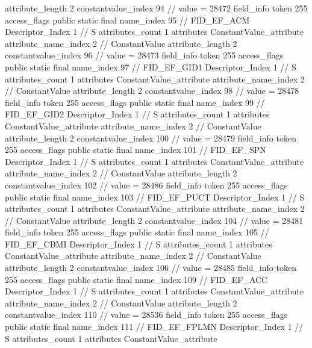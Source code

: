 {{{{{{{					attribute_length	2
					constantvalue_index	94		// value = 28472
				}
				}
			}
			field_info {
				token	255
				access_flags	public static final
				name_index	95		// FID_EF_ACM
				Descriptor_Index	1		// S
				attributes_count	1
				attributes {
				ConstantValue_attribute {
					attribute_name_index	2		// ConstantValue
					attribute_length	2
					constantvalue_index	96		// value = 28473
				}
				}
			}
			field_info {
				token	255
				access_flags	public static final
				name_index	97		// FID_EF_GID1
				Descriptor_Index	1		// S
				attributes_count	1
				attributes {
				ConstantValue_attribute {
					attribute_name_index	2		// ConstantValue
					attribute_length	2
					constantvalue_index	98		// value = 28478
				}
				}
			}
			field_info {
				token	255
				access_flags	public static final
				name_index	99		// FID_EF_GID2
				Descriptor_Index	1		// S
				attributes_count	1
				attributes {
				ConstantValue_attribute {
					attribute_name_index	2		// ConstantValue
					attribute_length	2
					constantvalue_index	100		// value = 28479
				}
				}
			}
			field_info {
				token	255
				access_flags	public static final
				name_index	101		// FID_EF_SPN
				Descriptor_Index	1		// S
				attributes_count	1
				attributes {
				ConstantValue_attribute {
					attribute_name_index	2		// ConstantValue
					attribute_length	2
					constantvalue_index	102		// value = 28486
				}
				}
			}
			field_info {
				token	255
				access_flags	public static final
				name_index	103		// FID_EF_PUCT
				Descriptor_Index	1		// S
				attributes_count	1
				attributes {
				ConstantValue_attribute {
					attribute_name_index	2		// ConstantValue
					attribute_length	2
					constantvalue_index	104		// value = 28481
				}
				}
			}
			field_info {
				token	255
				access_flags	public static final
				name_index	105		// FID_EF_CBMI
				Descriptor_Index	1		// S
				attributes_count	1
				attributes {
				ConstantValue_attribute {
					attribute_name_index	2		// ConstantValue
					attribute_length	2
					constantvalue_index	106		// value = 28485
				}
				}
			}
			field_info {
				token	255
				access_flags	public static final
				name_index	109		// FID_EF_ACC
				Descriptor_Index	1		// S
				attributes_count	1
				attributes {
				ConstantValue_attribute {
					attribute_name_index	2		// ConstantValue
					attribute_length	2
					constantvalue_index	110		// value = 28536
				}
				}
			}
			field_info {
				token	255
				access_flags	public static final
				name_index	111		// FID_EF_FPLMN
				Descriptor_Index	1		// S
				attributes_count	1
				attributes {
				ConstantValue_attribute {
}}}}}}}
